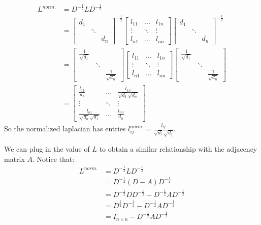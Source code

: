 \begin{align*}
    L^{norm.} &= D^{-\frac{1}{2}}L D^{-\frac{1}{2}} \\
    &= \begin{bmatrix}
        d_{1} & & \\
        & \ddots & \\
        & & d_n
    \end{bmatrix}^{-\frac{1}{2}}\begin{bmatrix}
        l_{11} & ... & l_{1n} \\
        \vdots & \ddots & \vdots \\
        l_{n1} & ... & l_{nn}
    \end{bmatrix}
    \begin{bmatrix}
        d_{1} & & \\
        & \ddots & \\
        & & d_n
    \end{bmatrix}^{-\frac{1}{2}} \\
    &= 
    \begin{bmatrix}
        \frac{1}{\sqrt{d_1}} & & \\
        & \ddots & \\
        & & \frac{1}{\sqrt{d_n}}
    \end{bmatrix}\begin{bmatrix}
        l_{11} & ... & l_{1n} \\
        \vdots & \ddots & \vdots \\
        l_{n1} & ... & l_{nn}
    \end{bmatrix}
    \begin{bmatrix}
        \frac{1}{\sqrt{d_1}} & & \\
        & \ddots & \\
        & & \frac{1}{\sqrt{d_n}}
    \end{bmatrix} \\
    &= \begin{bmatrix}
        \frac{l_{11}}{d_1} & ... & \frac{l_{1n}}{\sqrt{d_1}\sqrt{d_n}} \\
        \vdots & \ddots & \vdots \\
        \frac{l_{n1}}{\sqrt{d_n}\sqrt{d_1}} & ... & \frac{l_{nn}}{d_n}
    \end{bmatrix}
\end{align*}
So the normalized laplacian has entries $l^{norm.}_{ij} = \frac{l_{ij}}{\sqrt{d_i}\sqrt{d_j}}$.

We can plug in the value of $L$ to obtain a similar relationship with the adjacency matrix $A$. Notice that:
\begin{align*}
    L^{norm.} &=  D^{-\frac{1}{2}}L D^{-\frac{1}{2}} \\
    &=  D^{-\frac{1}{2}}(D - A) D^{-\frac{1}{2}} \\
    &= D^{-\frac{1}{2}}DD^{-\frac{1}{2}} - D^{-\frac{1}{2}}A D^{-\frac{1}{2}} \\
    &= D^{\frac{1}{2}}D^{-\frac{1}{2}} - D^{-\frac{1}{2}}A D^{-\frac{1}{2}} \\
    &= I_{n \times n} - D^{-\frac{1}{2}}A D^{-\frac{1}{2}}
\end{align*}

